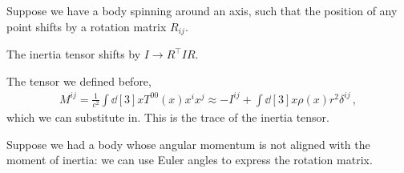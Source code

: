 \documentclass[main.tex]{subfiles}
\begin{document}
Suppose we have a body spinning around an axis, such that the position of any point shifts by a rotation matrix \(R_{ij}\). 

The inertia tensor shifts by \(I \rightarrow R^{\top} I R\).

The tensor we defined before, 
%
\begin{align}
M^{ij} = \frac{1}{c^2} \int \dd[3]{x} T^{00} (x) x^{i} x^{j} 
\approx - I^{ij} + \int \dd[3]{x} \rho (x) r^2 \delta^{ij}
\,,
\end{align}
%
which we can substitute in. This is the trace of the inertia tensor. 

Suppose we had a body whose angular momentum is not aligned with the moment of inertia: we can use Euler angles to express the rotation matrix.
\end{document}
